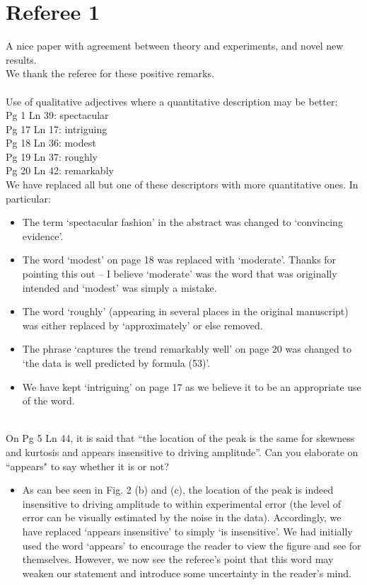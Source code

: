 \documentclass[11pt]{article}
\newcommand{\comment}[1]{{\color{blue} #1}}
\begin{document}
\section*{Referee 1}

\noindent
\comment{A nice paper with agreement between theory and experiments, and novel new results.} \\

\noindent
We thank the referee for these positive remarks. \\ \\

\noindent
\comment{
Use of qualitative adjectives where a quantitative description may be better: \\
Pg 1 Ln 39: spectacular \\
Pg 17 Ln 17: intriguing \\
Pg 18 Ln 36: modest \\
Pg 19 Ln 37: roughly \\
Pg 20 Ln 42: remarkably} \\

\noindent
We have replaced all but one of these descriptors with more quantitative ones. In particular:
\begin{itemize}
\item The term `spectacular fashion' in the abstract was changed to `convincing evidence'.
\item The word `modest' on page 18 was replaced with `moderate'. Thanks for pointing this out -- I believe `moderate' was the word that was originally intended and `modest' was simply a mistake.
\item The word `roughly' (appearing in several places in the original manuscript) was either replaced by `approximately' or else removed.
\item The phrase `captures the trend remarkably well' on page 20 was changed to `the data is well predicted by formula (53)'.
\item We have kept `intriguing' on page 17 as we believe it to be an appropriate use of the word.
\end{itemize}
\hphantom \\

\noindent
\comment{On Pg 5 Ln 44, it is said that ``the location of the peak is the same for skewness and kurtosis and appears insensitive to driving amplitude''. Can you elaborate on ``appears" to say whether it is or not?}

\begin{itemize}
\item As can bee seen in Fig. 2 (b) and (c), the location of the peak is indeed insensitive to driving amplitude to within experimental error (the level of error can be visually estimated by the noise in the data). Accordingly, we have replaced `appears insensitive' to simply `is insensitive'.
We had initially used the word `appears' to encourage the reader to view the figure and see for themselves. However, we now see the referee's point that this word may weaken our statement and introduce some uncertainty in the reader's mind.
\end{itemize}
\end{document}
